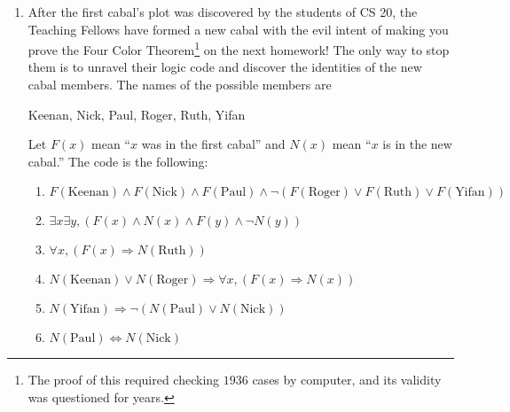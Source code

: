 \documentclass[12pt]{article}
\begin{document}
\begin{enumerate}
\item After the first cabal's plot was discovered by the students of CS 20, the Teaching Fellows have formed a new cabal with the evil intent of making you prove the Four Color Theorem\footnote{The proof of this required checking $1936$ cases by computer, and its validity was questioned for years.} on the next homework! The only way to stop them is to unravel their logic code and discover the identities of the new cabal members. The names of the possible members are \\
\begin{center} Keenan, Nick, Paul, Roger, Ruth, Yifan \end{center}

Let $F(x)$ mean ``$x$ was in the first cabal'' and $N(x)$ mean ``$x$ is in the new cabal.'' The code is the following:
\begin{enumerate}
\item$F(\text{Keenan})\land F(\text{Nick})\land F(\text{Paul})\land\lnot(F(\text{Roger})\lor F(\text{Ruth})\lor F(\text{Yifan}))$
\item$\exists x\exists y, (F(x)\land N(x)\land F(y)\land \lnot N(y))$
\item $\forall x, (F(x)\Rightarrow N(\text{Ruth}))$
\item $N(\text{Keenan})\lor N(\text{Roger})\Rightarrow \forall x, (F(x)\Rightarrow N(x))$
\item $N(\text{Yifan}) \Rightarrow \lnot (N(\text{Paul})\lor N(\text{Nick}))$
\item $N(\text{Paul})\Leftrightarrow N(\text{Nick})$
\end{enumerate}
\end{enumerate}
\end{document}
